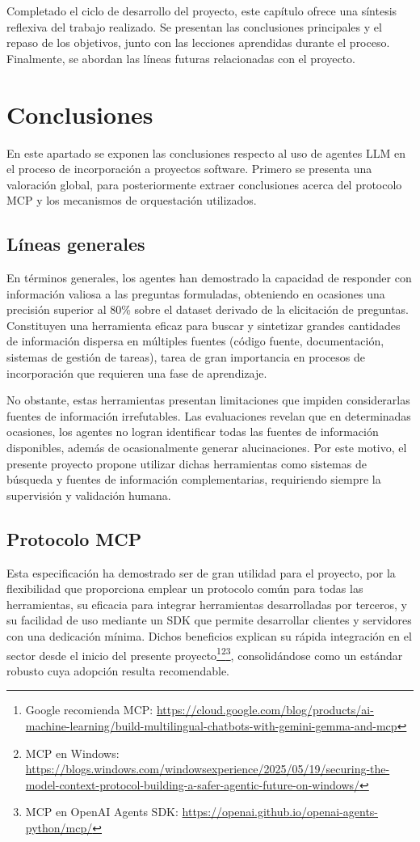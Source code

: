 Completado el ciclo de desarrollo del proyecto, este capítulo ofrece una síntesis reflexiva del trabajo realizado. Se presentan las conclusiones principales y el repaso de los objetivos, junto con las lecciones aprendidas durante el proceso. Finalmente, se abordan las líneas futuras relacionadas con el proyecto.

\section{Conclusiones}
En este apartado se exponen las conclusiones respecto al uso de agentes LLM en el proceso de incorporación a proyectos software. Primero se presenta una valoración global, para posteriormente extraer conclusiones acerca del protocolo MCP y los mecanismos de orquestación utilizados.

\subsection{Líneas generales}
En términos generales, los agentes han demostrado la capacidad de responder con información valiosa a las preguntas formuladas, obteniendo en ocasiones una precisión superior al 80\% sobre el dataset derivado de la elicitación de preguntas. Constituyen una herramienta eficaz para buscar y sintetizar grandes cantidades de información dispersa en múltiples fuentes (código fuente, documentación, sistemas de gestión de tareas), tarea de gran importancia en procesos de incorporación que requieren una fase de aprendizaje.

No obstante, estas herramientas presentan limitaciones que impiden considerarlas fuentes de información irrefutables. Las evaluaciones revelan que en determinadas ocasiones, los agentes no logran identificar todas las fuentes de información disponibles, además de ocasionalmente generar alucinaciones. Por este motivo, el presente proyecto propone utilizar dichas herramientas como sistemas de búsqueda y fuentes de información complementarias, requiriendo siempre la supervisión y validación humana.

\subsection{Protocolo MCP}
Esta especificación ha demostrado ser de gran utilidad para el proyecto, por la flexibilidad que proporciona emplear un protocolo común para todas las herramientas, su eficacia para integrar herramientas desarrolladas por terceros, y su facilidad de uso mediante un SDK que permite desarrollar clientes y servidores con una dedicación mínima. Dichos beneficios explican su rápida integración en el sector desde el inicio del presente proyecto\footnote{Google recomienda MCP: \url{https://cloud.google.com/blog/products/ai-machine-learning/build-multilingual-chatbots-with-gemini-gemma-and-mcp}}\footnote{MCP en Windows: \url{https://blogs.windows.com/windowsexperience/2025/05/19/securing-the-model-context-protocol-building-a-safer-agentic-future-on-windows/}}\footnote{MCP en OpenAI Agents SDK: \url{https://openai.github.io/openai-agents-python/mcp/}}, consolidándose como un estándar robusto cuya adopción resulta recomendable.

